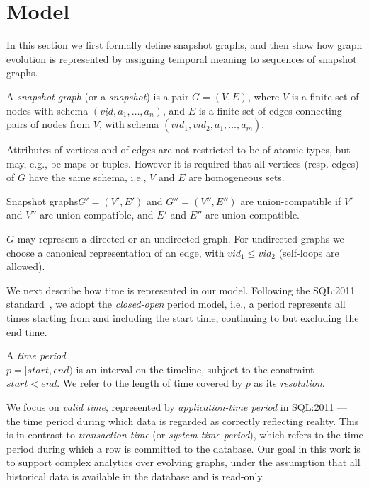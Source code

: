 \section{Model}
\label{sec:model}

In this section we first formally define snapshot graphs, and then
show how graph evolution is represented by assigning temporal meaning
to sequences of snapshot graphs.

\begin{definition}
\label{def:sg} 
A {\em snapshot graph} (or a {\em snapshot}) is a pair $G = (V,E)$,
where $V$ is a finite set of nodes with schema $(\underline{vid},
a_1, \ldots, a_n)$, and $E$ is a finite set of edges connecting
pairs of nodes from $V$, with schema $(\underline{vid_1},
\underline{vid_2}, a_1, \ldots, a_m)$.
\end{definition}

Attributes of vertices and of edges are not restricted to be of atomic
types, but may, e.g., be maps or tuples. However it is required that
all vertices (resp. edges) of $G$ have the same schema, i.e., $V$ and
$E$ are homogeneous sets.

\begin{definition} 
\label{def:scompat}
Snapshot graphs$G' = (V', E')$ and $G'' = (V'', E'')$ are
union-compatible if $V'$ and $V''$ are union-compatible, and $E'$ and
$E''$ are union-compatible.
\end{definition}

$G$ may represent a directed or an undirected graph.  For undirected
graphs we choose a canonical representation of an edge, with $vid_1
\leq vid_2$ (self-loops are allowed).

We next describe how time is represented in our model.  Following the
SQL:2011 standard~\cite{DBLP:journals/sigmod/KulkarniM12}, we adopt
the {\em closed-open} period model, i.e., a period represents all
times starting from and including the start time, continuing to but
excluding the end time.

\begin{definition}
\label{def:period} 
A {\em time period} \\$p = [start, end)$ is an interval on the timeline,
  subject to the constraint $start < end$.  We refer to the length of
  time covered by $p$ as its {\em resolution}.
\end{definition}

We focus on {\em valid time}, represented by {\em application-time
  period} in SQL:2011 --- the time period during which data is
regarded as correctly reflecting reality.  This is in contrast to {\em
  transaction time} (or {\em system-time period}), which refers to the
time period during which a row is committed to the database.  Our goal
in this work is to support complex analytics over evolving graphs,
under the assumption that all historical data is available in the
database and is read-only.

